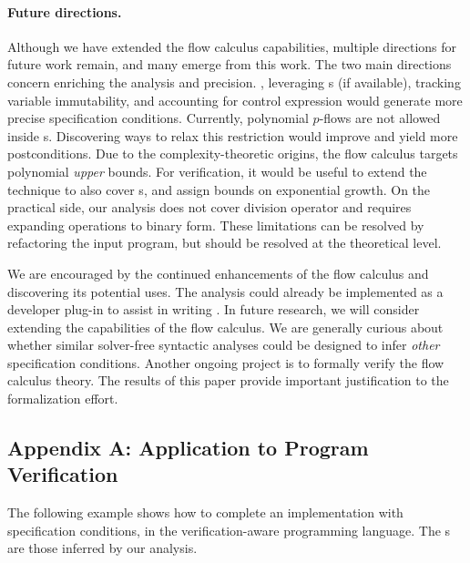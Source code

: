 \paragraph*{Future directions.}
Although we have extended the flow calculus capabilities,
multiple directions for future work remain, and many emerge from this work. The
two main directions concern enriching the analysis  and
precision. \Eg, leveraging s (if available), tracking variable
immutability, and accounting for control expression would generate more precise
specification conditions. Currently, polynomial \(p\)-flows are not allowed
inside s. Discovering ways to relax this restriction would
improve  and yield more postconditions. Due to the
complexity-theoretic origins, the flow
calculus  targets polynomial \emph{upper} bounds. For verification, it would be useful to extend the technique to also
cover s, and assign bounds on exponential growth. On the
practical side, our analysis does not cover division operator and requires
expanding operations to binary form. These limitations can be resolved by
refactoring the input program, but should be resolved at the theoretical level.

We are encouraged by the continued enhancements of the flow
calculus and discovering its potential uses. The analysis
could already be implemented as a developer plug-in to assist in writing
. In future research, we will consider extending the
capabilities of the flow calculus. We are generally curious
about whether similar solver-free syntactic analyses could be designed to infer
\emph{other} specification conditions. Another ongoing
project is to formally verify the flow calculus
theory. The results of this paper provide important justification to the
formalization effort.

\clearpage

\subsection{Appendix A: Application to Program Verification}
\label{app:sec:verified}

The following example shows how to complete an implementation with
specification conditions, in the verification-aware
 programming language. The s are those inferred by
our analysis.

